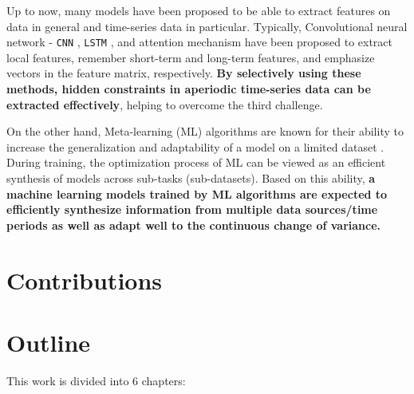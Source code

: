 Up to now, many models have been proposed to be able to extract features on data in general and time-series data in particular. Typically, Convolutional neural network - \verb|CNN| \cite{lecun1989handwritten}, \verb|LSTM| \cite{hochreiter1997long}, and attention mechanism \cite{bahdanau2014neural, luong2015effective, vaswani2017attention} have been proposed to extract local features, remember short-term and long-term features, and emphasize vectors in the feature matrix, respectively. \textbf{By selectively using these methods, hidden constraints in aperiodic time-series data can be extracted effectively}, helping to overcome the third challenge.


On the other hand, Meta-learning (ML) algorithms are known for their ability to increase the generalization and adaptability of a model on a limited dataset \cite{hospedales2021meta, vettoruzzo2024advances}. During training, the optimization process of ML can be viewed as an efficient synthesis of models across sub-tasks (sub-datasets). Based on this ability, \textbf{a machine learning models trained by ML algorithms are expected to efficiently synthesize information from multiple data sources/time periods as well as adapt well to the continuous change of variance.}

\section{Contributions}


\section{Outline}

This work is divided into 6 chapters:

